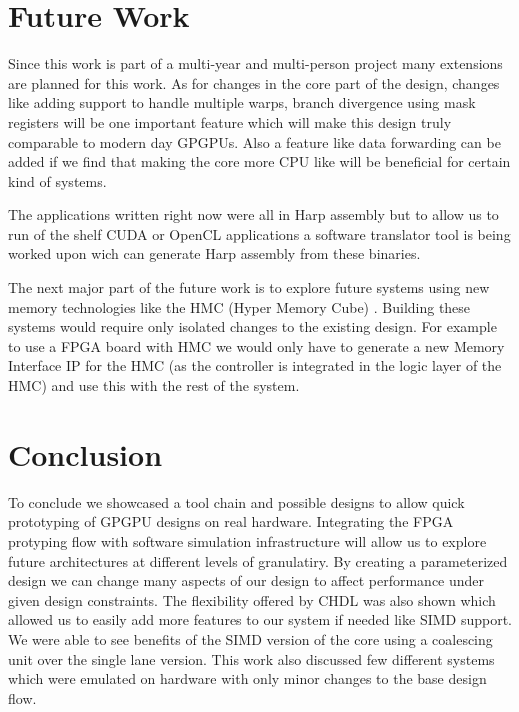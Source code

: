 \section{Future Work}
Since this work is part of a multi-year and multi-person project many extensions are planned for this work. As for changes in the core part of the design, changes like adding support to handle multiple warps, branch divergence using mask registers will be one important feature which will make this design truly comparable to modern day GPGPUs. Also a feature like data forwarding can be added if we find that making the core more CPU like will be beneficial for certain kind of systems.

The applications written right now were all in Harp assembly but to allow us to run of the shelf CUDA or OpenCL applications a software translator tool is being worked upon wich can generate Harp assembly from these binaries.

The next major part of the future work is to explore future systems using new memory technologies like the HMC (Hyper Memory Cube) \cite{hmc}. Building these systems would require only isolated changes to the existing design. For example to use a FPGA board with HMC we would only have to generate a new Memory Interface IP for the HMC (as the controller is integrated in the logic layer of the HMC) and use this with the rest of the system.

\section{Conclusion}
To conclude we showcased a tool chain and possible designs to allow quick prototyping of GPGPU designs on real hardware. Integrating the FPGA protyping flow with software simulation infrastructure will allow us to explore future architectures at different levels of granulatiry. By creating a parameterized design we can change many aspects of our design to affect performance under given design constraints. The flexibility offered by CHDL was also shown which allowed us to easily add more features to our system if needed like SIMD support. We were able to see benefits of the SIMD version of the core using a coalescing unit over the single lane version. This work also discussed few different systems which were emulated on hardware with only minor changes to the base design flow. 
